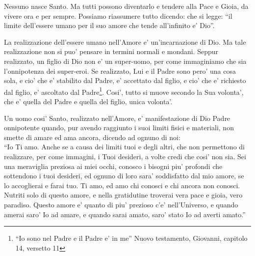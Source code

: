 Nessuno nasce Santo. Ma tutti possono diventarlo e tendere alla Pace e Gioia, da vivere ora e per sempre.
Possiamo riassumere tutto dicendo:
che si legge: ``il limite dell'essere umano per il suo amore che tende all'infinito e' Dio''.

La realizzazione dell'essere umano nell'Amore e' un'incarnazione di Dio. Ma tale realizzazione non si puo' pensare in termini normali e mondani. Seppur realizzato, un figlio di Dio non e' un super-uomo, per come immaginiamo che sia l'onnipotenza dei super-eroi. Se realizzato, Lui e il Padre sono pero' una cosa sola, e cio' che e' stabilito dal Padre, e' accettato dal figlio, e cio' che e' richiesto dal figlio, e' ascoltato dal Padre\footnote{``Io sono nel Padre e il Padre e' in me'' Nuovo testamento, Giovanni, capitolo 14, versetto 11}. Cosi', tutto si muove secondo la Sua volonta', che e' quella del Padre e quella del figlio, unica volonta'.

Un uomo cosi' Santo, realizzato nell'Amore, e' manifestazione di Dio Padre onnipotente quando, pur avendo raggiunto i suoi limiti fisici e materiali, non smette di amare ed ama ancora, dicendo ad ognuno di noi: \\
``Io Ti amo. Anche se a causa dei limiti tuoi e degli altri, che non permettono di realizzare, per come immagini, i Tuoi desideri, a volte credi che cosi' non sia. Sei una meraviglia preziosa ai miei occhi, conosco i bisogni piu' profondi che sottendono i tuoi desideri, ed ognuno di loro sara' soddisfatto dal mio amore, se lo accoglierai e farai tuo. Ti amo, ed amo chi conosci e chi ancora non conosci. Nutriti solo di questo amore, e nella gratidutine troverai vera pace e gioia, vero paradiso. Questo amore e' quanto di piu' prezioso c'e' nell'Universo, e quando amerai saro' Io ad amare, e quando sarai amato, saro' stato Io ad averti amato.''


